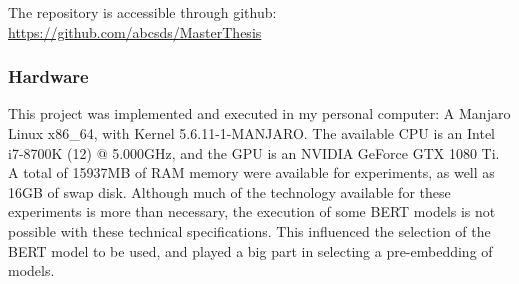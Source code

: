 The repository is accessible through github: \\
\url{https://github.com/abcsds/MasterThesis}

\subsubsection{Hardware}\label{subs:Hardware}
This project was implemented and executed in my personal computer: A Manjaro Linux x86_64, with Kernel 5.6.11-1-MANJARO. The available CPU is an Intel i7-8700K (12) @ 5.000GHz, and the GPU is an NVIDIA GeForce GTX 1080 Ti. A total of 15937MB of RAM memory were available for experiments, as well as 16GB of swap disk. Although much of the technology available for these experiments is more than necessary, the execution of some BERT models is not possible with these technical specifications. This influenced the selection of the BERT model to be used, and played a big part in selecting a pre-embedding of models.

